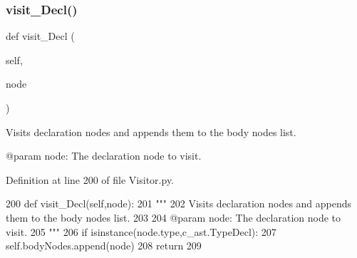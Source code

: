 \mbox{\label{classPostProcessor_1_1Visitor_1_1SourceRegHandler_a6568bead87923bbcaa593e5f226920f0}} 
\subsubsection{\texorpdfstring{visit\+\_\+\+Decl()}{visit\_Decl()}}
{\footnotesize\ttfamily def visit\+\_\+\+Decl (\begin{DoxyParamCaption}\item[{}]{self,  }\item[{}]{node }\end{DoxyParamCaption})}

\begin{DoxyVerb}Visits declaration nodes and appends them to the body nodes list.

@param node: The declaration node to visit.
\end{DoxyVerb}
 

Definition at line 200 of file Visitor.\+py.


\begin{DoxyCode}
200     \textcolor{keyword}{def }visit\_Decl(self,node):
201         \textcolor{stringliteral}{"""
}
202 \textcolor{stringliteral}{        Visits declaration nodes and appends them to the body nodes list.
}
203 \textcolor{stringliteral}{
}
204 \textcolor{stringliteral}{        @param node: The declaration node to visit.
}
205 \textcolor{stringliteral}{        """}
206         \textcolor{keywordflow}{if} isinstance(node.type,c\_ast.TypeDecl):
207             self.bodyNodes.append(node)
208         \textcolor{keywordflow}{return}
209     
\end{DoxyCode}
\mbox{\label{classPostProcessor_1_1Visitor_1_1SourceRegHandler_a876b22ca4502c2197e9881ebf8fb6288}} 
